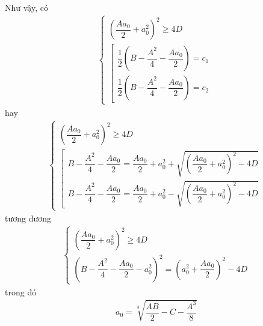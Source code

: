 \documentclass[a4paper,oneside]{book}
\numberwithin{equation}{chapter}
\begin{document}
Như vậy, có
\begin{align}
\left\{ {\begin{array}{*{20}{c}}
{{{\left( {\dfrac{{A{a_0}}}{2} + a_0^2} \right)}^2} \ge 4D}\\
{\left[ {\begin{array}{*{20}{c}}
{\dfrac{1}{2}\left( {B - \dfrac{{{A^2}}}{4} - \dfrac{{A{a_0}}}{2}} \right) = {c_1}}\\
{\dfrac{1}{2}\left( {B - \dfrac{{{A^2}}}{4} - \dfrac{{A{a_0}}}{2}} \right) = {c_2}}
\end{array}} \right.}
\end{array}} \right.
\end{align}
hay 
\begin{align}
\left\{ {\begin{array}{*{20}{c}}
{{{\left( {\dfrac{{A{a_0}}}{2} + a_0^2} \right)}^2} \ge 4D}\\
{\left[ {\begin{array}{*{20}{c}}
{B - \dfrac{{{A^2}}}{4} - \dfrac{{A{a_0}}}{2} = \dfrac{{A{a_0}}}{2} + a_0^2 + \sqrt {{{\left( {\dfrac{{A{a_0}}}{2} + a_0^2} \right)}^2} - 4D} }\\
{B - \dfrac{{{A^2}}}{4} - \dfrac{{A{a_0}}}{2} = \dfrac{{A{a_0}}}{2} + a_0^2 - \sqrt {{{\left( {\dfrac{{A{a_0}}}{2} + a_0^2} \right)}^2} - 4D} }
\end{array}} \right.}
\end{array}} \right.
\end{align}
tương đương
\begin{align}
\label{4.75}
\left\{ {\begin{array}{*{20}{c}}
{{{\left( {\dfrac{{A{a_0}}}{2} + a_0^2} \right)}^2} \ge 4D}\\
{{{\left( {B - \dfrac{{{A^2}}}{4} - \dfrac{{A{a_0}}}{2} - a_0^2} \right)}^2} = {{\left( {a_0^2 + \dfrac{{A{a_0}}}{2}} \right)}^2} - 4D}
\end{array}} \right.
\end{align}
trong đó 
\begin{align}
{a_0} = \sqrt[3]{{\dfrac{{AB}}{2} - C - \dfrac{{{A^3}}}{8}}}
\end{align}
\end{document}
